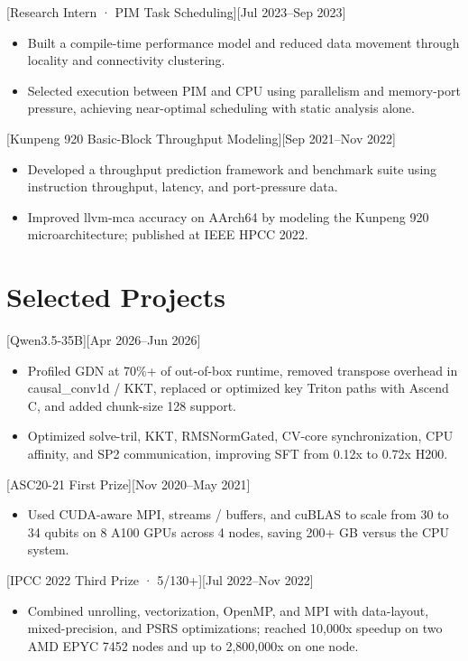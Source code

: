 \documentclass{resume}
\begin{document}
[Research Intern · PIM Task Scheduling][Jul 2023--Sep 2023]
\begin{itemize}
  \item Built a compile-time performance model and reduced data movement through locality and connectivity clustering.
  \item Selected execution between PIM and CPU using parallelism and memory-port pressure, achieving near-optimal scheduling with static analysis alone.
\end{itemize}

[Kunpeng 920 Basic-Block Throughput Modeling][Sep 2021--Nov 2022]
\begin{itemize}
  \item Developed a throughput prediction framework and benchmark suite using instruction throughput, latency, and port-pressure data.
  \item Improved llvm-mca accuracy on AArch64 by modeling the Kunpeng 920 microarchitecture; published at IEEE HPCC 2022.
\end{itemize}

\section{Selected Projects}
[Qwen3.5-35B][Apr 2026--Jun 2026]
\begin{itemize}
  \item Profiled GDN at 70\%+ of out-of-box runtime, removed transpose overhead in causal\_conv1d / KKT, replaced or optimized key Triton paths with Ascend C, and added chunk-size 128 support.
  \item Optimized solve-tril, KKT, RMSNormGated, CV-core synchronization, CPU affinity, and SP2 communication, improving SFT from 0.12x to 0.72x H200.
\end{itemize}

[ASC20-21 First Prize][Nov 2020--May 2021]
\begin{itemize}
  \item Used CUDA-aware MPI, streams / buffers, and cuBLAS to scale from 30 to 34 qubits on 8 A100 GPUs across 4 nodes, saving 200+ GB versus the CPU system.
\end{itemize}

[IPCC 2022 Third Prize · 5/130+][Jul 2022--Nov 2022]
\begin{itemize}
  \item Combined unrolling, vectorization, OpenMP, and MPI with data-layout, mixed-precision, and PSRS optimizations; reached 10,000x speedup on two AMD EPYC 7452 nodes and up to 2,800,000x on one node.
\end{itemize}
\end{document}
